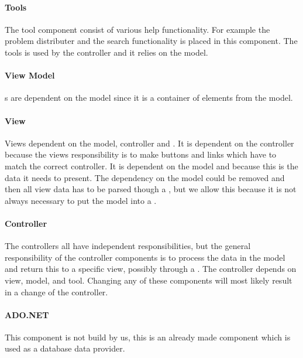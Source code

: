 \paragraph{Tools}
The tool component consist of various help functionality. For example the problem distributer and the search functionality is placed in this component. The tools is used by the controller and it relies on the model. 

\paragraph{View Model}
\viewmodel{}s are dependent on the model since it is a container of elements from the model.

\paragraph{View} 
Views dependent on the model, controller and \viewmodel{}. It is dependent on the controller because the views responsibility is to make buttons and links which have to match the correct controller. It is dependent on the model and \viewmodel{} because this is the data it needs to present. 
The dependency on the model could be removed and then all view data has to be parsed though a \viewmodel{}, but we allow this because it is not always necessary to put the model into a \viewmodel{}. 

\paragraph{Controller}
The controllers all have independent responsibilities, but the general responsibility of the controller components is to process the data in the model and return this to a specific view, possibly through a \viewmodel{}. The controller depends on view, model, \viewmodel{} and tool. Changing any of these components will most likely result in a change of the controller. 

\paragraph{ADO.NET}
This component is not build by us, this is an already made component which is used as a database data provider. 



